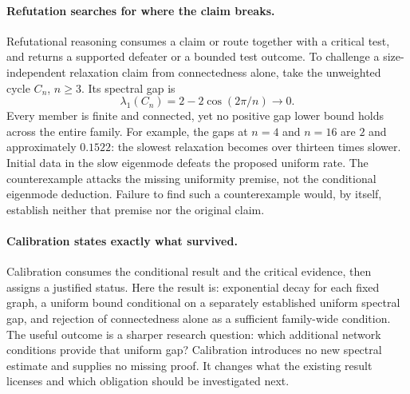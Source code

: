 \paragraph{Refutation searches for where the claim breaks.}
Refutational reasoning consumes a claim or route together with a critical test, and returns a supported defeater or a bounded test outcome. To challenge a size-independent relaxation claim from connectedness alone, take the unweighted cycle $C_n$, $n\geq3$. Its spectral gap is
\[
 \lambda_1(C_n)=2-2\cos(2\pi/n)\longrightarrow0.
\]
Every member is finite and connected, yet no positive gap lower bound holds across the entire family. For example, the gaps at $n=4$ and $n=16$ are $2$ and approximately $0.1522$: the slowest relaxation becomes over thirteen times slower. Initial data in the slow eigenmode defeats the proposed uniform rate. The counterexample attacks the missing uniformity premise, not the conditional eigenmode deduction. Failure to find such a counterexample would, by itself, establish neither that premise nor the original claim.

\paragraph{Calibration states exactly what survived.}
Calibration consumes the conditional result and the critical evidence, then assigns a justified status. Here the result is: exponential decay for each fixed graph, a uniform bound conditional on a separately established uniform spectral gap, and rejection of connectedness alone as a sufficient family-wide condition. The useful outcome is a sharper research question: which additional network conditions provide that uniform gap? Calibration introduces no new spectral estimate and supplies no missing proof. It changes what the existing result licenses and which obligation should be investigated next.

